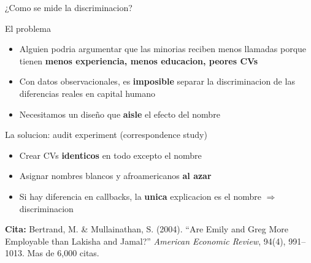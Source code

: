 \documentclass[aspectratio=169, 11pt]{beamer}
\begin{document}
\begin{frame}{¿Como se mide la discriminacion?}
\small
\begin{block}{El problema}
\begin{itemize}\setlength{\itemsep}{2pt}
  \item Alguien podria argumentar que las minorias reciben menos llamadas porque tienen \textbf{menos experiencia, menos educacion, peores CVs}
  \item Con datos observacionales, es \textbf{imposible} separar la discriminacion de las diferencias reales en capital humano
  \item Necesitamos un dise\~no que \textbf{aisle} el efecto del nombre
\end{itemize}
\end{block}

\vspace{0.2cm}
\begin{exampleblock}{La solucion: audit experiment (correspondence study)}
\begin{itemize}\setlength{\itemsep}{2pt}
  \item Crear CVs \textbf{identicos} en todo excepto el nombre
  \item Asignar nombres blancos y afroamericanos \textbf{al azar}
  \item Si hay diferencia en callbacks, la \textbf{unica} explicacion es el nombre $\Rightarrow$ discriminacion
\end{itemize}
\end{exampleblock}

\vspace{0.2cm}
\small \textbf{Cita:} Bertrand, M. \& Mullainathan, S. (2004). ``Are Emily and Greg More Employable than Lakisha and Jamal?'' \textit{American Economic Review}, 94(4), 991--1013. Mas de 6{,}000 citas.
\end{frame}
\end{document}
